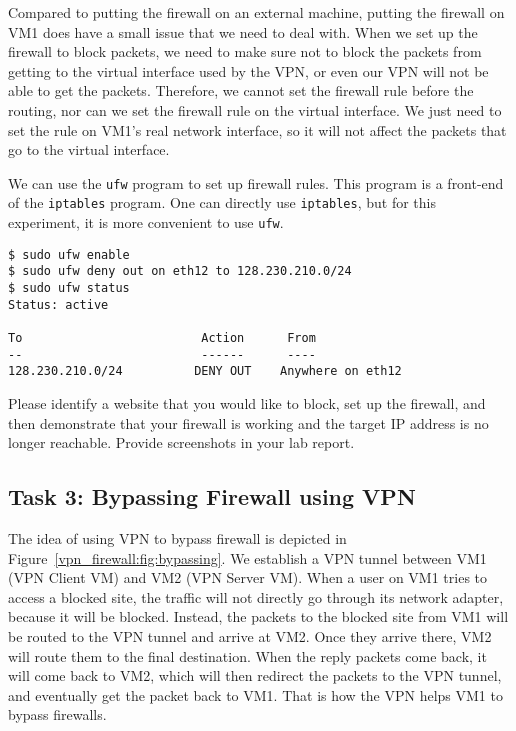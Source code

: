 Compared to putting the firewall on an external machine, putting the firewall on VM1 does have
a small issue that we need to deal with. When we set up the firewall to block packets, we need
to make sure not to block the packets from getting to the virtual interface used by the VPN, or even our
VPN will not be able to get the packets.  Therefore, we cannot set the firewall rule before the
routing, nor can we set the firewall rule on the virtual interface. We just need to set the
rule on VM1's real network interface, so it will not affect the packets that go to the virtual
interface.  

We can use the \texttt{ufw} program to set up firewall rules. This program is a
front-end of the \texttt{iptables} program. One can directly use
\texttt{iptables}, but for this experiment, it is more convenient to use \texttt{ufw}.


\begin{lstlisting}
$ sudo ufw enable
$ sudo ufw deny out on eth12 to 128.230.210.0/24
$ sudo ufw status
Status: active

To                         Action      From
--                         ------      ----
128.230.210.0/24          DENY OUT    Anywhere on eth12
\end{lstlisting}


 
Please identify a website that you would like to block, set up the firewall,
and then demonstrate that your firewall is working and the target IP address is no longer 
reachable. Provide screenshots in your lab report.  




\subsection{Task 3: Bypassing Firewall using VPN}



The idea of using VPN to bypass firewall is depicted in 
Figure~\ref{vpn_firewall:fig:bypassing}. 
We establish a VPN tunnel between VM1 (VPN Client VM) 
and VM2 (VPN Server VM). 
When a user on VM1 tries to access a blocked site, the traffic will not directly 
go through its network adapter, because it will be blocked. Instead, the 
packets to the blocked site from VM1 will be routed to the VPN tunnel and arrive at VM2. Once
they arrive there, VM2 will route them to the final destination. 
When the reply packets come back, it will come back to VM2, which will then redirect the
packets to the VPN tunnel, and eventually get the packet back to VM1. That is how the VPN helps
VM1 to bypass firewalls. 

